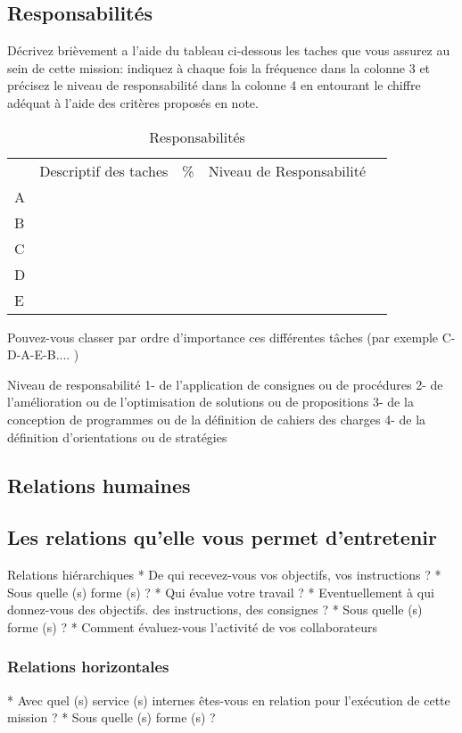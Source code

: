 \documentclass{resume} %
\begin{document}
	\subsection{Responsabilités}

Décrivez brièvement a l'aide du tableau ci-dessous les taches que vous assurez au sein de cette mission: indiquez à chaque fois la fréquence dans la colonne 3 et précisez le niveau de responsabilité dans la colonne 4 en entourant le chiffre adéquat à l'aide des critères proposés en note.
\begin{table}[!htbp]
\label{my-label}
\begin{tabular}{|l|l|l|l|l}
\cline{1-4}
   & Descriptif des taches &  \% & Niveau de
Responsabilité  &  \\ \cline{1-4}
 A&  &  &  &  \\ \cline{1-4}
 B&  &  &  &  \\ \cline{1-4}
 C&  &  &  &  \\ \cline{1-4}
 D&  &  &  &  \\ \cline{1-4}
 E&  &  &  &  \\ \cline{1-4}
\end{tabular}
\caption{Responsabilités}
\end{table}

Pouvez-vous classer par ordre d'importance ces différentes tâches (par exemple C-D-A-E-B.... )

Niveau de responsabilité
1- de l'application de consignes ou de procédures
2- de l'amélioration ou de l'optimisation de solutions ou de propositions
3- de la conception de programmes ou de la définition de cahiers des charges 
4- de la définition d'orientations ou de stratégies

	\subsection{Relations humaines}
	
		\subsection{Les relations qu'elle vous permet d'entretenir}
Relations hiérarchiques
* De qui recevez-vous vos objectifs, vos instructions ?
* Sous quelle (s) forme (s) ?
* Qui évalue votre travail ?
* Eventuellement à qui donnez-vous des objectifs. des instructions, des consignes ?
* Sous quelle (s) forme (s) ?
* Comment évaluez-vous l'activité de vos collaborateurs
		\subsubsection{Relations horizontales}
* Avec quel (s) service (s) internes êtes-vous en relation pour l'exécution de cette mission ?
* Sous quelle (s) forme (s) ?
\end{document}
